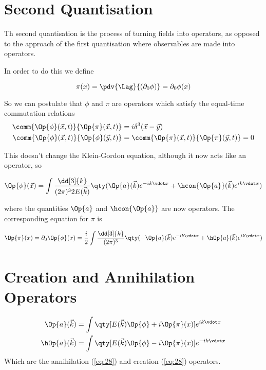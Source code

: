 \documentclass[ebook, openany, oldfontcommands,twocolumn, 10pt]{momento}
\begin{document}
\begin{expl}
\section{Second Quantisation}
\label{sec:second-quantisation}

Th second quantisation is the process of turning fields into
operators, as opposed to the approach of the first quantisation where
observables are made into operators.

In order to do this we define 
\begin{definition}
  \[ \pi(x) = \pdv{\Lag}{(\partial_0 \phi)} = \partial_0 \phi(x)  \]
\end{definition}
So we can postulate that $\phi$ and $\pi$ are operators which satisfy the equal-time commutation relations
\begin{subequations}
\begin{align}
  \comm{\Op{\phi}(\vec{x}, t)}{\Op{\pi} (\vec{x}, t)} &= i \delta^3(\vec{x} - \vec{y}) \\
\comm{\Op{\phi}(\vec{x}, t)}{\Op{\phi}(\vec{y}, t)} &= \comm{\Op{\pi}(\vec{x}, t)}{\Op{\pi}(\vec{y}, t)} = 0
\end{align}
\end{subequations}

This doesn't change the Klein-Gordon equation, although it now acts
like an operator, so

\begin{equation}
  \label{eq:22}
  \Op{\phi}(\vec{x}) = \int \frac{\dd[3]{k}}{(2 \pi)^3 2 E(\vec{k}) }
                      \qty(\Op{a}(\vec{k}) e^{-ik \vdot x} + \hcon{\Op{a}}(\vec{k}) e^{i k \vdot x})
\end{equation}

where the quantities $\Op{a}$ and $\hcon{\Op{a}}$ are now operators. The corresponding equation for $\pi$ is

\begin{equation}
  \label{eq:23}
  \Op{\pi} (x) = \partial_0 \Op{\phi}(x) = \frac{i}{2} \int \frac{\dd[3]{k}}{(2 \pi)^3} \qty( - \Op{a} (\vec{k}) e^{-ik \vdot x} + \hOp{a}(\vec{k}) e^{ik \vdot x} )
\end{equation}

\section{Creation and Annihilation Operators}
\label{sec:creat-annih-oper}

\begin{subequations}
  \begin{align}
   \label{eq:28}
    \Op{a}(\vec{k}) &= \int \qty[ E(\vec{k}) \Op{\phi} + i \Op{\pi}(x) ] e^{i k \vdot x} \\
   \label{eq:29}
    \hOp{a}(\vec{k}) &= \int \qty[E(\vec{k}) \Op{\phi} - i \Op{\pi}(x) ] e^{-i k \vdot x}
  \end{align}
\end{subequations}
Which are the annihilation (\ref{eq:28}) and creation (\ref{eq:28}) operators.


\end{expl}
\end{document}
